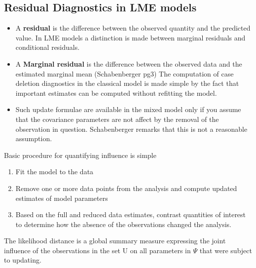 \documentclass[12pt, a4paper]{article}
\begin{document}
\subsection{Residual Diagnostics in LME models}
\begin{itemize}
	\item A \textbf{residual} is the difference between the observed quantity and the predicted value. In LME models a distinction is made between marginal residuals and conditional residuals.
	
	\item A \textbf{Marginal residual} is the difference between the observed data and the estimated marginal mean (Schabenberger  pg3)
	The computation of case deletion diagnostics in the classical model is made simple by the fact that important estimates can be computed without refitting the model. 
	
	\item Such update formulae are available in the mixed model only if you assume that the covariance parameters are not affect by the removal of the observation in question. Schabenberger remarks that this is not a reasonable assumption.
	
\end{itemize}


Basic procedure for quantifying influence is simple

\begin{enumerate}
	\item  	Fit the model to the data
	\item   	Remove one or more data points from the analysis and compute updated estimates of model parameters
	\item  	Based on the full and reduced data estimates, contrast quantities of interest to determine how the absence of the observations changed the analysis.
\end{enumerate}
The likelihood distance is a global summary measure expressing the joint influence of the observations in the set U on all parameters in $\Psi$ that were subject to updating.




\newpage
\end{document}
